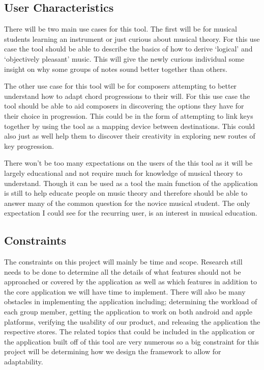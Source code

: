 \documentclass[onecolumn, draftclsnofoot,10pt, compsoc]{IEEEtran}
\begin{document}
\subsection{User Characteristics}
\par
There will be two main use cases for this tool. 
The first will be for musical students learning an instrument or just curious about musical theory. 
For this use case the tool should be able to describe the basics of how to derive ‘logical’ and ‘objectively pleasant’ music. 
This will give the newly curious individual some insight on why some groups of notes sound better together than others. 
\par
The other use case for this tool will be for composers attempting to better understand how to adapt chord progressions to their will.
For this use case the tool should be able to aid composers in discovering the options they have for their choice in progression.
This could be in the form of attempting to link keys together by using the tool as a mapping device between destinations.
This could also just as well help them to discover their creativity in exploring new routes of key progression.
\par
There won’t be too many expectations on the users of the this tool as it will be largely educational and not require much for knowledge of musical theory to understand.
Though it can be used as a tool the main function of the application is still to help educate people on music theory and therefore should be able to answer many of the common question for the novice musical student.
The only expectation I could see for the recurring user, is an interest in musical education.

\subsection{Constraints}
\par
The constraints on this project will mainly be time and scope.
Research still needs to be done to determine all the details of what features should not be approached or covered by the application as well as which features in addition to the core application we will have time to implement.
There will also be many obstacles in implementing the application including; determining the workload of each group member, getting the application to work on both android and apple platforms, verifying the usability of our product, and releasing the application the respective stores.
The related topics that could be included in the application or the application built off of this tool are very numerous so a big constraint for this project will be determining how we design the framework to allow for adaptability.
\end{document}
